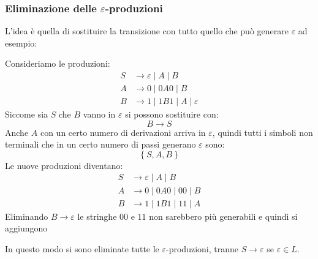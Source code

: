 \documentclass[a4paper]{article}
\begin{document}
\subsubsection{Eliminazione delle \texorpdfstring{\( \varepsilon \)}{epsilon}-produzioni}
L'idea è quella di sostituire la transizione con tutto quello che può generare
\( \varepsilon  \) ad esempio:
\begin{example}
  Consideriamo le produzioni:
  \[
    \begin{aligned}
      S &\to \varepsilon  \;|\; A \;|\; B\\
      A &\to  0\;|\; 0A0 \;|\; B \\
      B &\to 1 \;|\; 1B1 \;|\; A\;|\; \varepsilon 
    \end{aligned}
  \] 
  Siccome sia \( S \) che \( B \) vanno in \( \varepsilon  \) si possono sostituire con:
  \[
    B \to S
  \] 
  Anche \( A \) con un certo numero di derivazioni arriva in \( \varepsilon  \), quindi
  tutti i simboli non terminali che in un certo numero di passi generano \( \varepsilon  \)
  sono:
  \[
    \left\{ S, A, B \right\}
  \] 
  Le nuove produzioni diventano:
  \[
    \begin{aligned}
      S &\to \varepsilon \;|\; A \;|\; B \\
      A &\to 0 \;|\; 0A0 \;|\; 00 \;|\; B \\
      B &\to 1 \;|\; 1B1 \;|\; 11 \;|\; A
    \end{aligned}
  \] 
  Eliminando \( B \to \varepsilon  \) le stringhe \( 00 \) e \( 11 \) non sarebbero più
  generabili e quindi si aggiungono

  \vspace{1em}
  \noindent
  In questo modo si sono eliminate tutte le \( \varepsilon\)-produzioni, tranne
  \( S \to \varepsilon  \) se \( \varepsilon \in L \).
\end{example}
\end{document}
